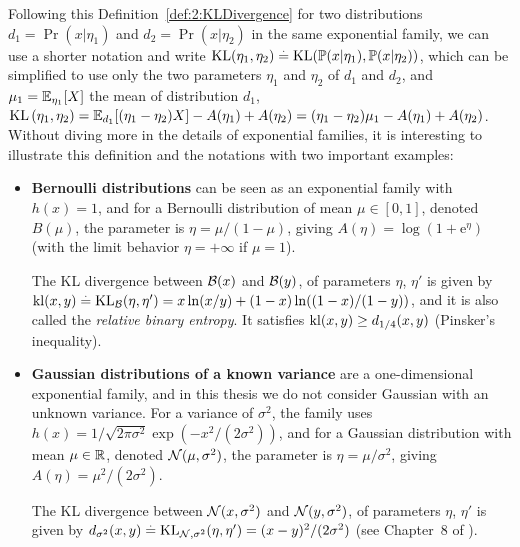 Following this Definition~\ref{def:2:KLDivergence} for two distributions
$d_1=\Pr(x|\eta_1)$ and $d_2=\Pr(x|\eta_2)$ in the same exponential family,
we can use a shorter notation and write $\mathrm{KL}( \eta_1, \eta_2 ) \overset{.}{=} \mathrm{KL}(\mathbb{P}(x|\eta_1), \mathbb{P}(x|\eta_2))$, which can be simplified to use only the two parameters $\eta_1$ and $\eta_2$ of $d_1$ and $d_2$,
and $\mu_1 = \mathbb{E}_{\eta_1}[X]$ the mean of distribution $d_1$,
%
$\mathrm{KL}\left( \eta_1, \eta_2 \right) = \mathbb{E}_{d_1}[ (\eta_1 - \eta_2) X ] - A(\eta_1) + A(\eta_2) = (\eta_1 - \eta_2) \mu_1 - A(\eta_1) + A(\eta_2)$.
%
Without diving more in the details of exponential families,
it is interesting to illustrate this definition and the notations with two important examples:

\label{par:2:notationsExponentialFamiliesBernoulliGaussian}
\begin{itemize}
    \item
    \textbf{Bernoulli distributions} can be seen as an exponential family with $h(x) = 1$,
    and for a Bernoulli distribution of mean $\mu\in[0,1]$, denoted $B(\mu)$,
    the parameter is $\eta = \mu / (1 - \mu)$, giving $A(\eta) = \log(1 + \mathrm{e}^{\eta})$
    (with the limit behavior $\eta=+\infty$ if $\mu=1$).

    The KL divergence between $\mathcal{B}(x)$ and $\mathcal{B}(y)$, of parameters $\eta$, $\eta'$ is given by
    $\mathrm{kl}(x,y) \overset{.}{=} \mathrm{KL}_{\mathcal{B}}(\eta,\eta') = x \ln(x/y) + (1-x) \ln((1-x)/(1-y))$,
    and it is also called the \emph{relative binary entropy}.
    It satisfies $\mathrm{kl}(x,y) \geq d_{1/4}(x,y)$ (Pinsker's inequality).

    \item
    \textbf{Gaussian distributions of a known variance} are a one-dimensional exponential family,
    and in this thesis we do not consider Gaussian with an unknown variance.
    For a variance of $\sigma^2$, the family uses
    $h(x) = 1/\sqrt{2\pi\sigma^2} \exp(-x^2/(2\sigma^2))$,
    and for a Gaussian distribution with mean $\mu\in\mathbb{R}$, denoted $\mathcal{N}(\mu,\sigma^2)$,
    the parameter is $\eta = \mu/\sigma^2$, giving $A(\eta) = \mu^2/(2\sigma^2)$.

    The KL divergence between $\mathcal{N}(x,\sigma^2)$ and $\mathcal{N}(y,\sigma^2)$, of parameters $\eta$, $\eta'$ is given by
    $d_{\sigma^2}(x,y) \overset{.}{=} \mathrm{KL}_{\mathcal{N},\sigma^2}(\eta,\eta') = (x-y)^2 / (2\sigma^2)$
    (see Chapter~8 of \cite{JordanCourseStatBerkeley}).
\end{itemize}


